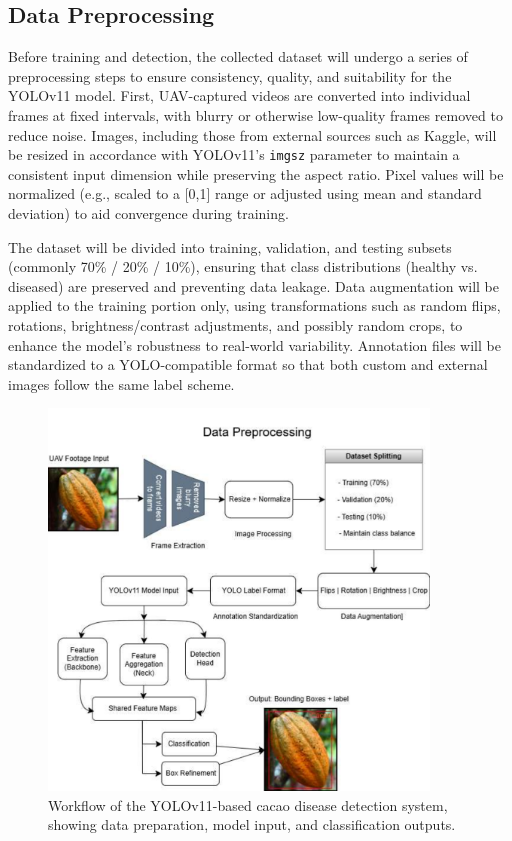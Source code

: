 \subsection*{Data Preprocessing}

Before training and detection, the collected dataset will undergo a series of preprocessing steps to ensure consistency, quality, and suitability for the YOLOv11 model. First, UAV-captured videos are converted into individual frames at fixed intervals, with blurry or otherwise low-quality frames removed to reduce noise. Images, including those from external sources such as Kaggle, will be resized in accordance with YOLOv11's \texttt{imgsz} parameter to maintain a consistent input dimension while preserving the aspect ratio. Pixel values will be normalized (e.g., scaled to a [0,1] range or adjusted using mean and standard deviation) to aid convergence during training.

The dataset will be divided into training, validation, and testing subsets (commonly 70\% / 20\% / 10\%), ensuring that class distributions (healthy vs. diseased) are preserved and preventing data leakage. Data augmentation will be applied to the training portion only, using transformations such as random flips, rotations, brightness/contrast adjustments, and possibly random crops, to enhance the model’s robustness to real-world variability. Annotation files will be standardized to a YOLO-compatible format so that both custom and external images follow the same label scheme.


\begin{figure}[H]
	\centering
	\caption{Workflow of the YOLOv11-based cacao disease detection system, showing data preparation, model input, and classification outputs.}
	\label{fig:Data Preprocessing Workflow}
	\includegraphics[width=0.9\textwidth]{figures/Data Processing.pdf}
\end{figure}

